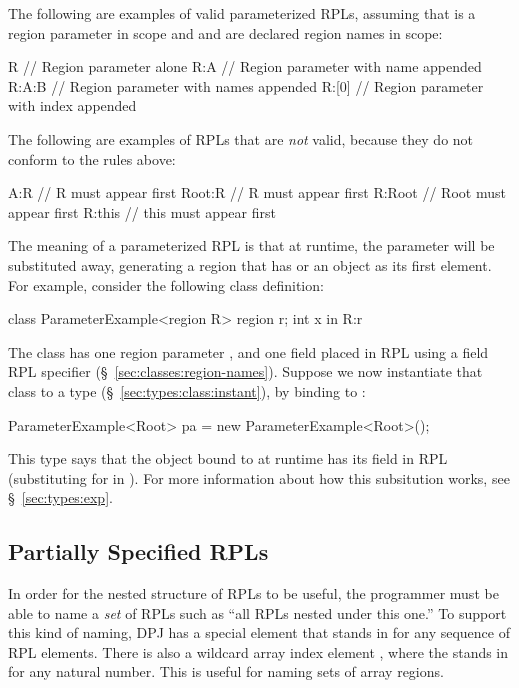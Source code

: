 The following are examples of valid parameterized RPLs, assuming that
 is a region parameter in scope and  and  are
declared region names in scope:
%
\begin{dpjlisting}
R      // Region parameter alone
R:A    // Region parameter with name appended
R:A:B  // Region parameter with names appended
R:[0]  // Region parameter with index appended
\end{dpjlisting}

The following are examples of RPLs that are \emph{not} valid, because
they do not conform to the rules above:
%
\begin{dpjlisting}
A:R      // R must appear first
Root:R   // R must appear first
R:Root   // Root must appear first
R:this   // this must appear first
\end{dpjlisting}

The meaning of a parameterized RPL is that at runtime, the parameter
will be substituted away, generating a region that has  or
an object as its first element.  For example, consider the following
class definition:
%
\begin{dpjlisting}
class ParameterExample<region R> {
    region r;
    int x in R:r
}
\end{dpjlisting}
%
The class  has one region parameter , and
one field  placed in RPL  using a field RPL specifier
(\S~\ref{sec:classes:region-names}).  Suppose we now instantiate that
class to a type (\S~\ref{sec:types:class:instant}), by binding
 to :
%
\begin{dpjlisting}
ParameterExample<Root> pa = new ParameterExample<Root>();
\end{dpjlisting}
%
This type says that the object bound to  at runtime has its
field  in RPL  (substituting  for 
in ).  For more information about how this subsitution works,
see \S~\ref{sec:types:exp}.

\subsection{Partially Specified RPLs%
\label{sec:rpls:partial}}

In order for the nested structure of RPLs to be useful, the programmer
must be able to name a \emph{set} of RPLs such as ``all RPLs nested
under this one.''  To support this kind of naming, DPJ has a special
element \kwd{*} that stands in for any sequence of RPL elements.
There is also a wildcard array index element \kwd{[?]}, where the
 stands in for any natural number.  This is useful for naming
sets of array regions.


